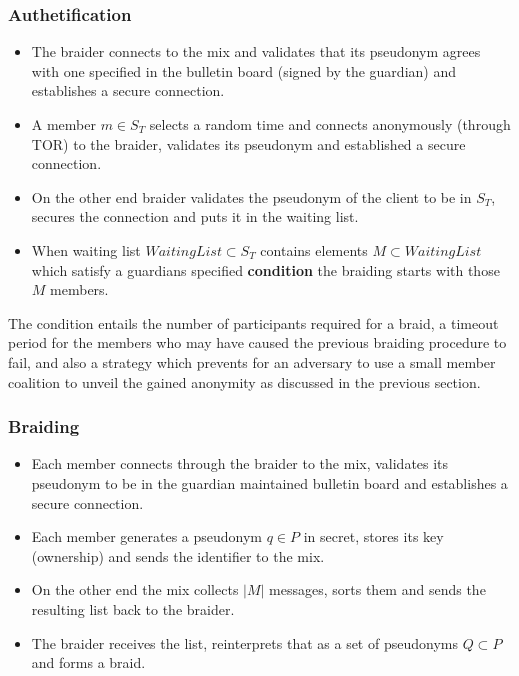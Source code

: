 \documentclass[12pt]{article}
\begin{document}
\subsubsection*{Authetification}

\begin{itemize}
\item The braider connects to the mix and validates that its pseudonym agrees with one specified in the bulletin board (signed by the guardian) and establishes a secure connection. 
\item A member $m \in S_T$ selects a random time and connects anonymously (through TOR) to the braider, validates its pseudonym and established a secure connection.
\item On the other end braider validates the pseudonym of the client to be in $S_T$, secures the connection and puts it in the waiting list.
\item When waiting list $WaitingList \subset S_T$ contains elements $M \subset WaitingList$ which satisfy a guardians specified {\bf condition} the braiding starts with those $M$ members.
\end{itemize}

The condition entails the number of participants required for a braid, a timeout period for the members who may have caused the previous braiding procedure to fail, and also a strategy which prevents for an adversary to use a small member coalition to unveil the gained anonymity as discussed in the previous section.

\subsubsection*{Braiding}

\begin{itemize}
\item Each member connects through the braider to the mix, validates its pseudonym to be in the guardian maintained bulletin board and establishes a secure connection.
\item Each member generates a pseudonym $q \in P$ in secret, stores its key (ownership) and sends the identifier to the mix.
\item On the other end the mix collects $|M|$ messages, sorts them and sends the resulting list back to the braider.
\item The braider receives the list, reinterprets that as a set of pseudonyms $Q \subset P$ and forms a braid.
\end{itemize}
\end{document}
